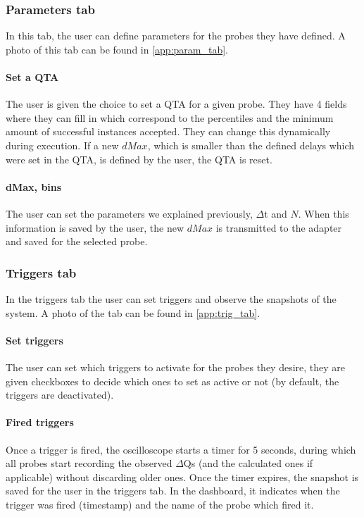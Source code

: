     \subsubsection{Parameters tab}
        In this tab, the user can define parameters for the probes they have defined. A photo of this tab can be found in \cref{app:param_tab}.

    \paragraph{Set a QTA}
        The user is given the choice to set a QTA for a given probe. They have 4 fields where they can fill in which correspond to the percentiles and the minimum amount of successful instances accepted. They can change this dynamically during execution. If a new $dMax$, which is smaller than the defined delays which were set in the QTA, is defined by the user, the QTA is reset.

    \paragraph{dMax, bins}
        The user can set the parameters we explained previously, $\Delta$t and $N$. When this information is saved by the user, the new $dMax$ is transmitted to the adapter and saved for the selected probe.

    \subsubsection{Triggers tab}
        In the triggers tab the user can set triggers and observe the snapshots of the system. A photo of the tab can be found in \cref{app:trig_tab}.

    \paragraph{Set triggers}
        The user can set which triggers to activate for the probes they desire, they are given checkboxes to decide which ones to set as active or not (by default, the triggers are deactivated).
    
    \paragraph{Fired triggers}
        Once a trigger is fired, the oscilloscope starts a timer for 5 seconds, during which all probes start recording the observed $\Delta$Qs (and the calculated ones if applicable) without discarding older ones. Once the timer expires, the snapshot is saved for the user in the triggers tab. In the dashboard, it indicates when the trigger was fired (timestamp) and the name of the probe which fired it.
    
